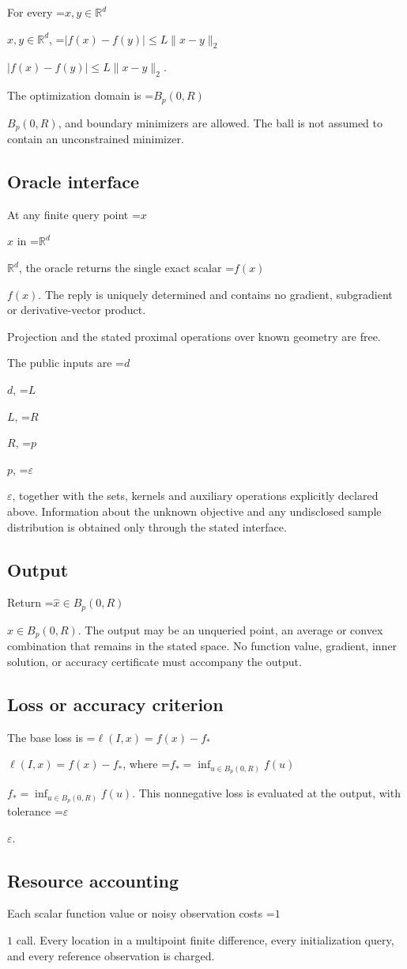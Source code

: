 \documentclass[10pt,a4paper]{article}
\newcommand{\AtlasMath}[1]{\par\begingroup\centering\setbox0=\hbox{$\displaystyle #1$}\ifdim\wd0>1.4\linewidth\typeout{ATLAS WIDE FORMULA: \the\wd0}\fi\ifdim\wd0>\linewidth\resizebox{\linewidth}{!}{\box0}\else\box0\fi\par\endgroup}
\newcommand{\AtlasInlineMath}[1]{\begingroup\setbox0=\hbox{$#1$}\ifdim\wd0>.4\linewidth\endgroup\AtlasMath{#1}\else\endgroup$#1$\fi}
\begin{document}
For every \AtlasInlineMath{x,y\in\mathbb{R}^d}, \AtlasInlineMath{|f(x)-f(y)|\le L\|x-y\|_2}.

The optimization domain is \AtlasInlineMath{B_p(0,R)}, and boundary minimizers are allowed. The ball is not assumed to contain an unconstrained minimizer.

\subsection{Oracle interface}
At any finite query point \AtlasInlineMath{x} in \AtlasInlineMath{\mathbb{R}^d}, the oracle returns the single exact scalar \AtlasInlineMath{f(x)}. The reply is uniquely determined and contains no gradient, subgradient or derivative-vector product.

Projection and the stated proximal operations over known geometry are free.

The public inputs are \AtlasInlineMath{d}, \AtlasInlineMath{L}, \AtlasInlineMath{R}, \AtlasInlineMath{p}, \AtlasInlineMath{\varepsilon}, together with the sets, kernels and auxiliary operations explicitly declared above. Information about the unknown objective and any undisclosed sample distribution is obtained only through the stated interface.

\subsection{Output}
Return \AtlasInlineMath{\widehat{x}\in B_p(0,R)}. The output may be an unqueried point, an average or convex combination that remains in the stated space. No function value, gradient, inner solution, or accuracy certificate must accompany the output.

\subsection{Loss or accuracy criterion}
The base loss is \AtlasInlineMath{\ell(I,x)=f(x)-f_*}, where \AtlasInlineMath{f_*=\inf_{u\in B_p(0,R)}f(u)}. This nonnegative loss is evaluated at the output, with tolerance \AtlasInlineMath{\varepsilon}.

\subsection{Resource accounting}
Each scalar function value or noisy observation costs \AtlasInlineMath{1} call. Every location in a multipoint finite difference, every initialization query, and every reference observation is charged.
\end{document}
